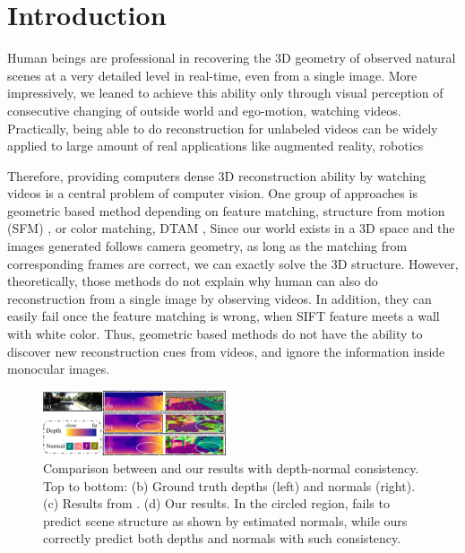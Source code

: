 
\vspace{-1.0\baselineskip}
\section{Introduction}
\label{sec:intro}
\vspace{-0.3\baselineskip}

Human beings are professional in recovering the 3D geometry of observed natural scenes at a very detailed level in real-time, even from a single image. 
More impressively, we leaned to achieve this ability only through visual perception of consecutive changing of outside world and ego-motion, \ie watching videos. 
Practically, being able to do reconstruction for unlabeled videos can be widely applied to large amount of real applications like augmented reality, robotics \etc

Therefore, providing computers dense 3D reconstruction ability by watching videos is a central problem of computer vision. 
One group of approaches is geometric based method depending on feature matching, \eg structure from motion (SFM) \cite{wu2011visualsfm} \etc, or color matching, \eg DTAM \cite{NewcombeLD11}, \etc  Since our world exists in a 3D space and the images generated follows camera geometry, as long as the matching from corresponding frames are correct, we can exactly solve the 3D structure. 
However, theoretically, those methods do not explain why human can also do reconstruction from a single image by observing videos. In addition, they can easily fail once the feature matching is wrong, \eg when SIFT \cite{lowe2004distinctive}  feature meets a wall with white color. 
Thus, geometric based methods do not have the ability to discover new reconstruction cues from videos, and ignore the information inside monocular images.

\begin{figure}
\centering
\includegraphics[width=0.48\textwidth, height=0.18\textwidth]{figures/visual_comparison_comp-v2.pdf}
\caption{Comparison between \cite{zhou2017unsupervised} and our results with depth-normal consistency. Top to bottom: (b) Ground truth depths (left) and normals (right). (c) Results from \cite{zhou2017unsupervised}. (d) Our results. In the circled region, \cite{zhou2017unsupervised} fails to predict scene structure as shown by estimated normals, while ours correctly predict both depths and normals with such consistency.}
\vspace{-1.0\baselineskip}
\label{fig:visual_comparison}
\end{figure}

